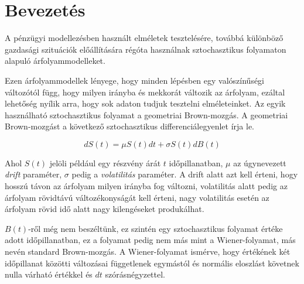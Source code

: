 \documentclass[a4paper, 12pt]{article}
\numberwithin{equation}{section}          %
\numberwithin{figure}{subsection}
\begin{document}
	
	\newpage \vspace*{2cm}
	\thispagestyle{plain}                                                                                                                                             
	 \setcounter{page}{1}
	\tableofcontents
	
	\clearpage \vspace*{2cm}
	\thispagestyle{plain}
	\listoffigures
	
	 \setcounter{page}{1}
	\thispagestyle{fancy}
	\clearpage
	
	

	\section{Bevezetés}
	
		A pénzügyi modellezésben használt elméletek tesztelésére, továbbá
		különböző gazdasági szituációk előállítására régóta használnak sztochasztikus folyamaton
		alapuló árfolyammodelleket.
		
		Ezen árfolyammodellek lényege, hogy minden lépésben egy valószínűségi változótól függ,
		hogy milyen irányba és mekkorát változik az árfolyam, ezáltal lehetőség nyílik
		arra, hogy sok adaton tudjuk tesztelni elméleteinket.
		Az egyik használható sztochasztikus folyamat a geometriai Brown-mozgás.
		A geometriai Brown-mozgást a következő sztochasztikus differenciálegyenlet írja le.
		
		\begin{equation}
		dS(t) = \mu S(t) dt + \sigma S(t) dB(t)
		\end{equation}
	
		Ahol $S(t)$ jelöli például egy részvény árát $t$ időpillanatban, $\mu$ az úgynevezett \textit{drift} paraméter, $\sigma$ pedig a \textit{volatilitás} paraméter.
		A drift alatt azt kell érteni, hogy hosszú távon az árfolyam milyen irányba fog változni,
		volatilitás alatt pedig az árfolyam rövidtávú változékonyságát kell érteni, nagy 
		volatilitás esetén az árfolyam rövid idő alatt nagy kilengéseket produkálhat.
		
		$B(t)$-ről még nem beszéltünk, ez szintén egy sztochasztikus folyamat értéke adott
		időpillanatban, ez a folyamat pedig nem más mint a Wiener-folyamat, más nevén standard
		Brown-mozgás. A Wiener-folyamat ismérve, hogy értékének két időpillanat közötti változásai 
		függetlenek egymástól és normális eloszlást követnek nulla várható értékkel és $dt$
		szórásnégyzettel.
		
\end{document}
